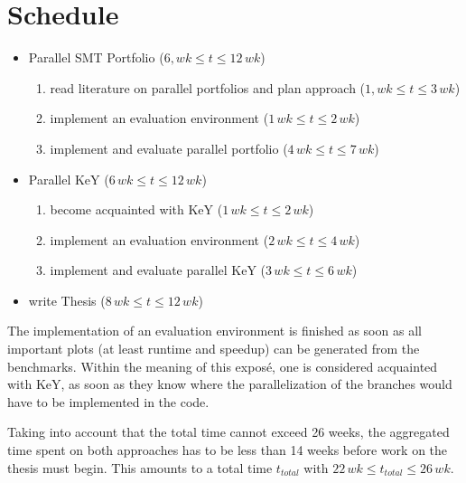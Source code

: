 \documentclass{scrartcl}
\begin{document}
\section{Schedule}
\begin{itemize}
    \item Parallel SMT Portfolio (\(6, wk \le t \le 12\, wk\))
    \begin{enumerate}
        \item read literature on parallel portfolios and plan approach
            (\(1, wk \le t \le 3\, wk\))
        \item implement an evaluation environment
            (\(1\, wk \le t \le 2\, wk\))
        \item implement and evaluate parallel portfolio
            (\(4\, wk \le t \le 7\, wk\))
    \end{enumerate}
    \item Parallel KeY (\(6\, wk \le t \le 12\, wk\))
    \begin{enumerate}
        \item become acquainted with KeY
            (\(1\, wk \le t \le 2\, wk\))
        \item implement an evaluation environment
            (\(2\, wk \le t \le 4\, wk\))
        \item implement and evaluate parallel KeY
            (\(3\, wk \le t \le 6\, wk\))
    \end{enumerate}
    \item write Thesis (\(8\, wk \le t \le 12\, wk\))
\end{itemize}
The implementation of an evaluation environment is finished as soon as
all important plots (at least runtime and speedup) can be generated from the benchmarks.
Within the meaning of this exposé, one is considered acquainted with KeY,
as soon as they know where the parallelization of the branches would have to be
implemented in the code.

Taking into account that the total time cannot exceed 26 weeks,
the aggregated time spent on both approaches has to be less than 14 weeks
before work on the thesis must begin.
This amounts to a total time \(t_{total}\) with \(22\, wk \le t_{total} \le 26\, wk\).
\printbibliography
\end{document}
